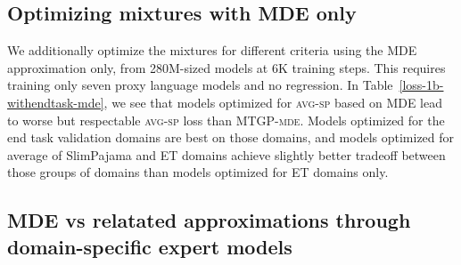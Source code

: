 \subsection{Optimizing mixtures with MDE only}
We additionally optimize the mixtures for different criteria using the MDE approximation only, from 280M-sized models at 6K training steps. This requires training only seven proxy language models and no regression. In Table~\ref{loss-1b-withendtask-mde}, we see that models optimized for \textsc{avg-sp} based on MDE lead to worse but respectable \textsc{avg-sp} loss than MTGP-\textsc{mde}. Models optimized for the end task validation domains are best on those domains, and models optimized for average of SlimPajama and ET domains achieve slightly better tradeoff between those groups of domains than models optimized for ET domains only.


\begin{table}[htbp]
\begin{center}
\begin{small}
 \begin{sc}
 \end{sc}
 \end{small}
 \end{center}
 \caption{Generalization on SlimPajama and end task validation domains for 1B models trained for 100B tokens. Comparing MDE to MTGP-\textsc{mde} and \textsc{Linear-mde} optimized weights. We report average perplexities on SlimPajama and end task validation domains.} 
 \label{loss-1b-withendtask-mde}
 \end{table}
 

 
 
 \subsection{MDE vs relatated approximations through domain-specific expert models}
 
